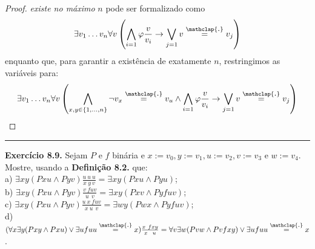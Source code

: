 \documentclass[11pt]{article}
\newcommand\overtext[2]{\stackrel{\mathclap{\normalfont\mbox{#1}}}{#2}}
\begin{document}
\begin{proof}
    \textit{existe no máximo} $n$ pode ser formalizado como
    $$\exists v_1\dots v_n\forall v\left(\bigwedge_{i=1}\varphi\frac{v}{v_i}\rightarrow\bigvee_{j=1}v\overtext{.}{=}v_j\right)$$
    enquanto que, para garantir a existência de exatamente $n$, restringimos as variáveis para:
    $$\exists v_1\dots v_n\forall v\left(\bigwedge_{x,y\in\{1,\dots,n\}}\neg v_x\overtext{.}{=}v_u\wedge\bigwedge_{i=1}\varphi\frac{v}{v_i}\rightarrow\bigvee_{j=1}v\overtext{.}{=}v_j\right)$$
\end{proof}

\hrule

\begin{shaded}
\textbf{Exercício 8.9.} Sejam $P$ e $f$ binária e $x:=v_0,y:=v_1,u:=v_2,v:=v_3$ e $w:=v_4$. Mostre, usando a \textbf{Definição 8.2.} que:\\
a) $\exists xy(Pxu\wedge Pyv)\frac{u~u~u}{x~y~v}=\exists xy(Pxu\wedge Pyu)$;\\
b) $\exists xy(Pxu\wedge Pyv)\frac{v~fuv}{u~~v}=\exists xy(Pxv\wedge Pyfuv)$;\\
c) $\exists xy(Pxu\wedge Pyv)\frac{u~x~fuv}{x~u~~v}=\exists wy(Pwx\wedge Pyfuv)$;\\
d) $(\forall x\exists y(Pxy\wedge Pxu)\vee\exists ufuu\overtext{.}{=}x)\frac{x~fxy}{x~~u}=\forall v\exists w(Pvw\wedge Pvfxy)\vee\exists ufuu\overtext{.}{=}x$.
\end{shaded}
\end{document}
